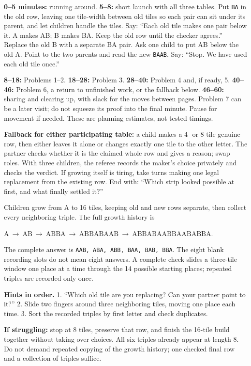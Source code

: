 \documentclass[11pt,letterpaper]{article}
\newcommand{\head}[1]{\par\vspace{5pt}{\large\bfseries #1}\par\nopagebreak\vspace{1pt}}
\newcommand{\problem}[2]{\par\vspace{5pt}{\bfseries Problem #1\quad #2}\par\nopagebreak}
\newcommand{\word}[1]{\texttt{#1}}
\newcommand{\hint}[1]{\textbf{Hints in order.} #1}
\newcommand{\chain}[1]{\par\hspace{8pt}$#1$\par}
\newcommand{\A}{\mathrm{A}}
\begin{document}
\head{The hour}
\textbf{0--5 minutes:} running around. \textbf{5--8:} short launch with all three tables. Put \word{BA} in the old row, leaving one tile-width between old tiles so each pair can sit under its parent, and let children handle the tiles. Say: ``Each old tile makes one pair below it. A makes AB; B makes BA. Keep the old row until the checker agrees.'' Replace the old B with a separate BA pair. Ask one child to put AB below the old A. Point to the two parents and read the new \word{BAAB}. Say: ``Stop. We have used each old tile once.''

\textbf{8--18:} Problems 1--2. \textbf{18--28:} Problem 3. \textbf{28--40:} Problem 4 and, if ready, 5. \textbf{40--46:} Problem 6, a return to unfinished work, or the fallback below. \textbf{46--60:} sharing and clearing up, with slack for the moves between pages. Problem 7 can be a later visit; do not squeeze its proof into the final minute. Pause for movement if needed. These are planning estimates, not tested timings.

\textbf{Fallback for either participating table:} a child makes a 4- or 8-tile genuine row, then either leaves it alone or changes exactly one tile to the other letter. The partner checks whether it is the claimed whole row and gives a reason; swap roles. With three children, the referee records the maker's choice privately and checks the verdict. If growing itself is tiring, take turns making one legal replacement from the existing row. End with: ``Which strip looked possible at first, and what finally settled it?''

\problem{1}{Core, student page 1}
Children grow from A to 16 tiles, keeping old and new rows separate, then collect every neighboring triple. The full growth history is
\chain{\A\ \longrightarrow\ \mathrm{AB}\ \longrightarrow\ \mathrm{ABBA}\ \longrightarrow\ \mathrm{ABBABAAB}\ \longrightarrow\ \mathrm{ABBABAABBAABABBA}.}
The complete answer is \word{AAB, ABA, ABB, BAA, BAB, BBA}. The eight blank recording slots do not mean eight answers. A complete check slides a three-tile window one place at a time through the 14 possible starting places; repeated triples are recorded only once.

\hint{1. ``Which old tile are you replacing? Can your partner point to it?'' 2. Slide two fingers around three neighboring tiles, moving one place each time. 3. Sort the recorded triples by first letter and check duplicates.}

\textbf{If struggling:} stop at 8 tiles, preserve that row, and finish the 16-tile build together without taking over choices. All six triples already appear at length 8. Do not demand repeated copying of the growth history; one checked final row and a collection of triples suffice.
\end{document}
